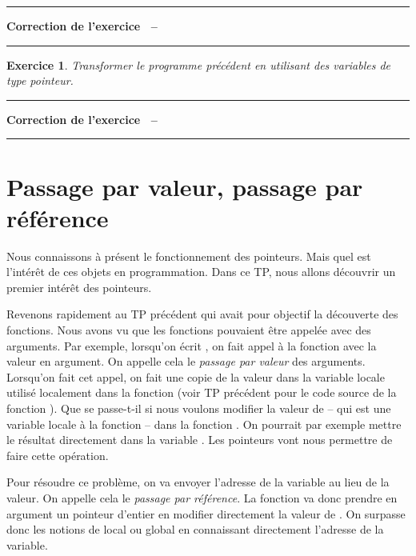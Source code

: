 \documentclass[a4paper]{article}
\newtheorem{Exo}{Exercice}
\newenvironment{Correction}{\par\tiny\blue\rule[1ex]{\textwidth}{1pt}\par\normalsize\textbf{Correction de l'exercice~\theExo{} -- }}{\par\tiny\blue\rule[1ex]{\textwidth}{1pt}\par}
\begin{document}
		\begin{Correction}
		\end{Correction}
		\begin{Exo}
			Transformer le programme précédent en utilisant des variables de type pointeur.
		\end{Exo}
		\begin{Correction}
		\end{Correction}
	\section{Passage par valeur, passage par référence}
		Nous connaissons à présent le fonctionnement des pointeurs.
		Mais quel est l'intérêt de ces objets en programmation.
		Dans ce TP, nous allons découvrir un premier intérêt des pointeurs.

		Revenons rapidement au TP précédent qui avait pour objectif la découverte des fonctions.
		Nous avons vu que les fonctions pouvaient être appelée avec des arguments.
		Par exemple, lorsqu'on écrit , on fait appel à la fonction  avec la valeur  en argument.
		On appelle cela le \emph{passage par valeur} des arguments.
		Lorsqu'on fait cet appel, on fait une copie de la valeur  dans la variable locale  utilisé localement dans la fonction  (voir TP précédent pour le code source de la fonction ).
		Que se passe-t-il si nous voulons modifier la valeur de  -- qui est une variable locale à la fonction  -- dans la fonction .
		On pourrait par exemple mettre le résultat directement dans la variable .
		Les pointeurs vont nous permettre de faire cette opération.

		Pour résoudre ce problème, on va envoyer l'adresse de la variable au lieu de la valeur.
		On appelle cela le \emph{passage par référence}.
		La fonction  va donc prendre en argument un pointeur d'entier en modifier directement la valeur de .
		On surpasse donc les notions de local ou global en connaissant directement l'adresse de la variable.
\end{document}
